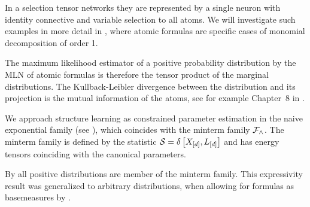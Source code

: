 In a selection tensor networks they are represented by a single neuron with identity connective and variable selection to all atoms.
We will investigate such examples in more detail in , where atomic formulas \MarkovLogicNetworks{} are specific cases of monomial decomposition of order 1.

The maximum likelihood estimator of a positive probability distribution by the MLN of atomic formulas is therefore the tensor product of the marginal distributions.
The Kullback-Leibler divergence between the distribution and its projection is the mutual information of the atoms, see for example Chapter~8 in \cite{mackay_information_2003}.

\begin{remark}
\end{remark}







We approach structure learning as constrained parameter estimation in the naive exponential family (see ), which coincides with the minterm family $\mathcal{F}_{\land}$.
The minterm family is defined by the statistic $\mathcal{S} = \delta\left[X_{[d]}, L_{[d]}\right]$ and has energy tensors coinciding with the canonical parameters.



By  all positive distributions are member of the minterm \MarkovLogicNetwork{} family.
This expressivity result was generalized to arbitrary distributions, when allowing for formulas as basemeasures by .

